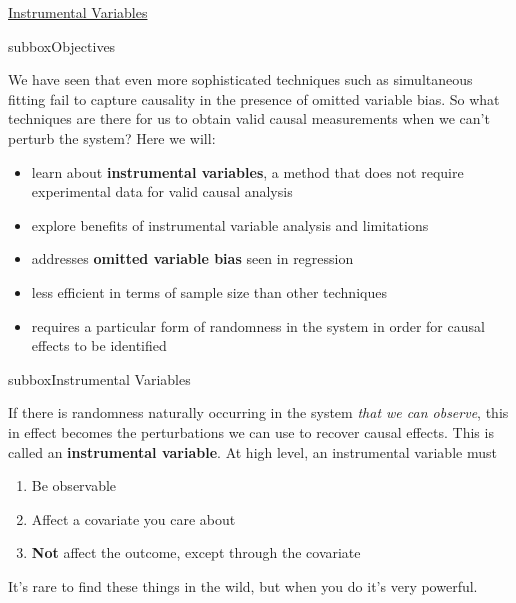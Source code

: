 \begin{textbox}{\href{https://compneuro.neuromatch.io/tutorials/W3D5_NetworkCausality/student/W3D5_Tutorial4.html}{Instrumental Variables }   }

\begin{subbox}{subbox}{Objectives}
\scriptsize


We have seen that even more sophisticated techniques such as simultaneous fitting fail to capture causality in the presence of omitted variable bias. So what techniques are there for us to obtain valid causal measurements when we can't perturb the system? Here we will:
\begin{itemize}
    \item 
 learn about \textbf{instrumental variables}, a method that does not require experimental data for valid causal analysis
\item  explore benefits of instrumental variable analysis and limitations
 \item  addresses \textbf{omitted variable bias} seen in regression
   \item  less efficient in terms of sample size than other techniques
 \item  requires a particular form of randomness in the system in order for causal effects to be identified
    \end{itemize}

\end{subbox}

\begin{subbox}{subbox}{Instrumental Variables}
\scriptsize

If there is randomness naturally occurring in the system \textit{that we can observe}, this in effect becomes the perturbations we can use to recover causal effects. This is called an \textbf{instrumental variable}. At high level, an instrumental variable must
\begin{enumerate}
    
\item Be observable
\item  Affect a covariate you care about
\item  \textbf{Not} affect the outcome, except through the covariate
\end{enumerate}

It's rare to find these things in the wild, but when you do it's very powerful.
\begin{center}
    

\end{center}
\end{subbox}
\end{textbox}
